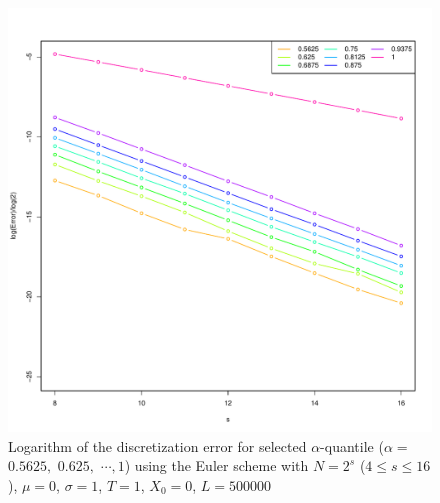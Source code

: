 \documentclass[cjk]{beamer}
\begin{document}
\begin{frame}
\begin{figure}
   \centering
   \includegraphics[scale=0.4]{nout_0log.pdf} %
   \caption{Logarithm of the discretization error for selected $\alpha$-quantile ($\alpha =$ $0.5625,$ $0.625,$ 
   $\cdots, 1$) using the Euler scheme with $N = 2^s$ ($4\le s \le 16$), $\mu=0$, $\sigma=1$, $T=1$, $X_0=0$, $L=500000$}
   \label{f:lerr}
\end{figure}
\end{frame}
\end{document}
